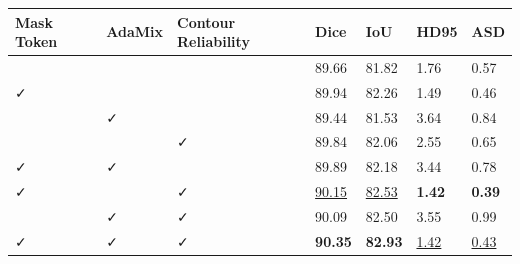 \begin{tabular}{lllllll}
\toprule
Mask Token & AdaMix & Contour Reliability & Dice & IoU & HD95 & ASD \\
\midrule
 &  &  & 89.66 & 81.82 & 1.76 & 0.57 \\
✓ &  &  & 89.94 & 82.26 & 1.49 & 0.46 \\
 & ✓ &  & 89.44 & 81.53 & 3.64 & 0.84 \\
 &  & ✓ & 89.84 & 82.06 & 2.55 & 0.65 \\
✓ & ✓ &  & 89.89 & 82.18 & 3.44 & 0.78 \\
✓ &  & ✓ & \underline{90.15} & \underline{82.53} & \textbf{1.42} & \textbf{0.39} \\
 & ✓ & ✓ & 90.09 & 82.50 & 3.55 & 0.99 \\
✓ & ✓ & ✓ & \textbf{90.35} & \textbf{82.93} & \underline{1.42} & \underline{0.43} \\
\bottomrule
\end{tabular}
